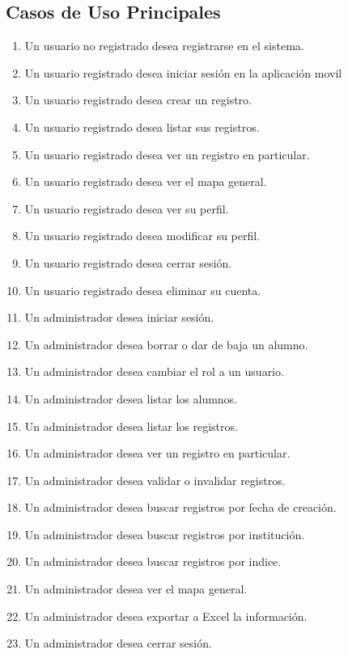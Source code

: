 		\subsection{Casos de Uso Principales}
			\begin{enumerate}[CU1:]
				\itemsep-1em
				\item Un usuario no registrado desea registrarse en el sistema.
				\item Un usuario registrado desea iniciar sesión en la aplicación movil
				\item Un usuario registrado desea crear un registro.
				\item Un usuario registrado desea listar sus registros.
				\item Un usuario registrado desea ver un registro en particular.
				\item Un usuario registrado desea ver el mapa general.
				\item Un usuario registrado desea ver su perfil.
				\item Un usuario registrado desea modificar su perfil.
				\item Un usuario registrado desea cerrar sesión.
				\item Un usuario registrado desea eliminar su cuenta.
				\item Un administrador desea iniciar sesión.
				\item Un administrador desea borrar o dar de baja un alumno.
				\item Un administrador desea cambiar el rol a un usuario.
				\item Un administrador desea listar los alumnos.
				\item Un administrador desea listar los registros.
				\item Un administrador desea ver un registro en particular.
				\item Un administrador desea validar o invalidar registros.
				\item Un administrador desea buscar registros por fecha de creación.
				\item Un administrador desea buscar registros por institución.
				\item Un administrador desea buscar registros por indice.
				\item Un administrador desea ver el mapa general.
				\item Un administrador desea exportar a Excel la información.
				\item Un administrador desea cerrar sesión.
			\end{enumerate}


	